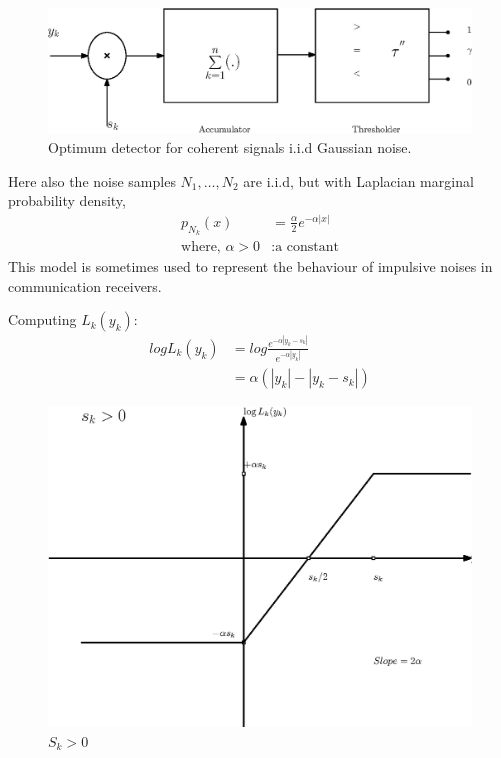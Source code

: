 \documentclass[12pt]{report}
\begin{document}
\begin{exmp}
		\begin{figure}[h]
			\centering
			\includegraphics[scale=0.9]{Figures/MatchedDetector.eps}
			\caption{Optimum detector for coherent signals i.i.d Gaussian noise.}
			\label{fig:MatchedDetector}
		\end{figure}
	\end{exmp}
	
	\begin{exmp}
		Here also the noise samples $N_1, \ldots ,N_2$ are i.i.d, but with Laplacian marginal probability density,
		\begin{align*}
		p_{N_k}(x) &= \frac{\alpha}{2}e^{-\alpha |x|}\\
		\text{where, } \alpha >0 &: \text{a constant}
		\end{align*}
		This model is sometimes used to represent the behaviour of impulsive noises in communication receivers.
		
		Computing $L_k(y_k)$:
		\begin{align*}
		log L_k(y_k) &= log \frac{e^{- \alpha |y_k-s_k|}}{e^{- \alpha |y_k|}}\\
		&= \alpha (|y_k|-|y_k-s_k|)
		\end{align*}
		
		\begin{figure}[h]
			\centering
			\includegraphics[scale=0.6]{Figures/Sk_greaterthanzero.eps}
			\caption{$S_k>0$}
			\label{fig:Sk_greaterthanzero}
		\end{figure}
		

\end{exmp}
\end{document}
